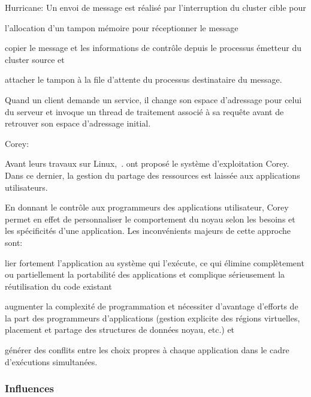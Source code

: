 \begin{paragraph}{Hurricane:}
        Un envoi de message est réalisé par l’interruption du cluster cible
        pour\benumline \item l’allocation d’un tampon mémoire pour réceptionner
        le message \item copier le message et les informations de contrôle
        depuis le processus émetteur du cluster source et \item attacher le
        tampon à la file d’attente du processus destinataire du
        message\eenumline.

        Quand un client demande un service, il change son espace d’adressage
        pour celui du serveur et invoque un thread de traitement associé à sa
        requête avant de retrouver son espace d’adressage initial.

      \end{paragraph}
      
      \begin{paragraph}{Corey:}

        Avant leurs travaux sur Linux,~\citet{boyd2008corey}. ont proposé le
        système d’exploitation Corey. Dans ce dernier, la gestion du partage des
        ressources est laissée aux applications utilisateurs.

        En donnant le contrôle aux programmeurs des applications utilisateur,
        Corey permet en effet de personnaliser le comportement du noyau selon
        les besoins et les spécificités d’une application. Les inconvénients
        majeurs de cette approche sont: \benumline \item lier fortement
        l’application au système qui l’exécute, ce qui élimine complètement ou
        partiellement la portabilité des applications et complique sérieusement
        la réutilisation du code existant \item augmenter la complexité de
        programmation et nécessiter d’avantage d’efforts de la part des
        programmeurs d’applications (gestion explicite des régions virtuelles,
        placement et partage des structures de données noyau, etc.) et \item
        générer des conflits entre les choix propres à chaque application dans
        le cadre d'exécutions simultanées\eenumline.

      \end{paragraph}
      
    \subsubsection{Influences}

